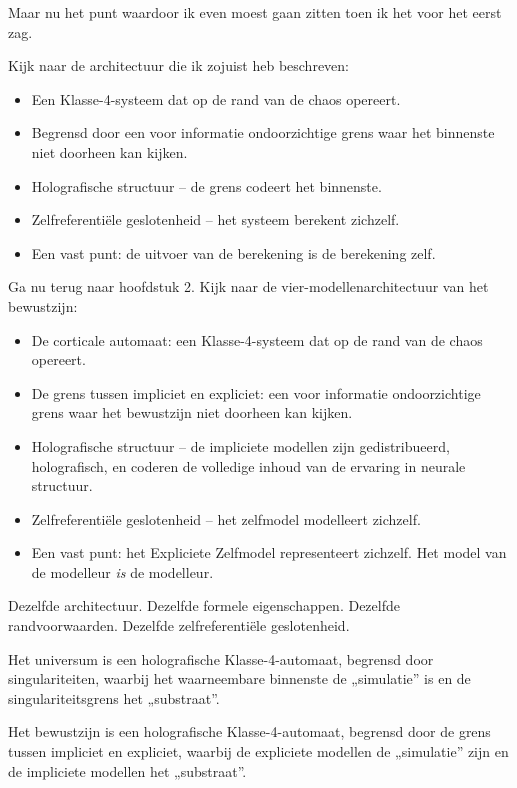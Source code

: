 \documentclass[11pt, twoside, openright]{book}
\begin{document}
Maar nu het punt waardoor ik even moest gaan zitten toen ik het voor het eerst zag.

Kijk naar de architectuur die ik zojuist heb beschreven:

\begin{itemize}
  \item Een Klasse-4-systeem dat op de rand van de chaos opereert.
  \item Begrensd door een voor informatie ondoorzichtige grens waar het binnenste niet doorheen kan kijken.
  \item Holografische structuur -- de grens codeert het binnenste.
  \item Zelfreferentiële geslotenheid -- het systeem berekent zichzelf.
  \item Een vast punt: de uitvoer van de berekening is de berekening zelf.
\end{itemize}

Ga nu terug naar hoofdstuk 2. Kijk naar de vier-modellenarchitectuur van het bewustzijn:

\begin{itemize}
  \item De corticale automaat: een Klasse-4-systeem dat op de rand van de chaos opereert.
  \item De grens tussen impliciet en expliciet: een voor informatie ondoorzichtige grens waar het bewustzijn niet doorheen kan kijken.
  \item Holografische structuur -- de impliciete modellen zijn gedistribueerd, holografisch, en coderen de volledige inhoud van de ervaring in neurale structuur.
  \item Zelfreferentiële geslotenheid -- het zelfmodel modelleert zichzelf.
  \item Een vast punt: het Expliciete Zelfmodel representeert zichzelf. Het model van de modelleur \textit{is} de modelleur.
\end{itemize}

Dezelfde architectuur. Dezelfde formele eigenschappen. Dezelfde randvoorwaarden. Dezelfde zelfreferentiële geslotenheid.

Het universum is een holografische Klasse-4-automaat, begrensd door singulariteiten, waarbij het waarneembare binnenste de „simulatie” is en de singulariteitsgrens het „substraat”.

Het bewustzijn is een holografische Klasse-4-automaat, begrensd door de grens tussen impliciet en expliciet, waarbij de expliciete modellen de „simulatie” zijn en de impliciete modellen het „substraat”.
\end{document}
